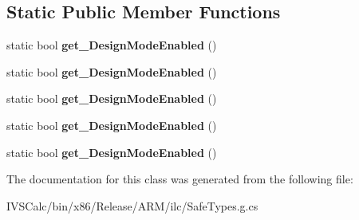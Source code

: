 \subsection*{Static Public Member Functions}
\begin{DoxyCompactItemize}
\item 
\mbox{\label{class_windows_1_1_application_model_1_1_design_mode_ac8328c63f7641e3b3fe644953faabd07}} 
static bool {\bfseries get\+\_\+\+Design\+Mode\+Enabled} ()
\item 
\mbox{\label{class_windows_1_1_application_model_1_1_design_mode_ac8328c63f7641e3b3fe644953faabd07}} 
static bool {\bfseries get\+\_\+\+Design\+Mode\+Enabled} ()
\item 
\mbox{\label{class_windows_1_1_application_model_1_1_design_mode_ac8328c63f7641e3b3fe644953faabd07}} 
static bool {\bfseries get\+\_\+\+Design\+Mode\+Enabled} ()
\item 
\mbox{\label{class_windows_1_1_application_model_1_1_design_mode_ac8328c63f7641e3b3fe644953faabd07}} 
static bool {\bfseries get\+\_\+\+Design\+Mode\+Enabled} ()
\item 
\mbox{\label{class_windows_1_1_application_model_1_1_design_mode_ac8328c63f7641e3b3fe644953faabd07}} 
static bool {\bfseries get\+\_\+\+Design\+Mode\+Enabled} ()
\end{DoxyCompactItemize}


The documentation for this class was generated from the following file\+:\begin{DoxyCompactItemize}
\item 
I\+V\+S\+Calc/bin/x86/\+Release/\+A\+R\+M/ilc/Safe\+Types.\+g.\+cs\end{DoxyCompactItemize}
